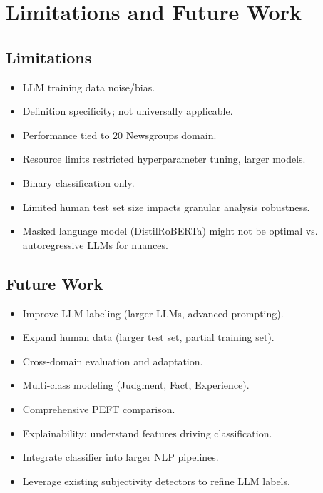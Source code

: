 \documentclass{article}
\begin{document}
\section{Limitations and Future Work}
\label{sec:limitations_future_work}
\subsection{Limitations}
\label{sec:limitations}
\begin{itemize}[leftmargin=*, noitemsep, topsep=0pt]
\item LLM training data noise/bias.
\item Definition specificity; not universally applicable.
\item Performance tied to 20 Newsgroups domain.
\item Resource limits restricted hyperparameter tuning, larger models.
\item Binary classification only.
\item Limited human test set size impacts granular analysis robustness.
\item Masked language model (DistilRoBERTa) might not be optimal vs. autoregressive LLMs for nuances.
\end{itemize}

\subsection{Future Work}
\label{sec:future_work}
\begin{itemize}[leftmargin=*, noitemsep, topsep=0pt]
  \item Improve LLM labeling (larger LLMs, advanced prompting).
  \item Expand human data (larger test set, partial training set).
  \item Cross-domain evaluation and adaptation.
  \item Multi-class modeling (Judgment, Fact, Experience).
  \item Comprehensive PEFT comparison.
  \item Explainability: understand features driving classification.
  \item Integrate classifier into larger NLP pipelines.
  \item Leverage existing subjectivity detectors to refine LLM labels.
\end{itemize}
\end{document}
